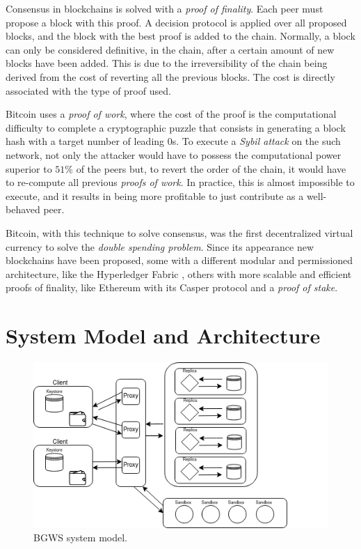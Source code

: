 \documentclass[10pt,journal,compsoc]{IEEEtran}
\begin{document}
	Consensus in blockchains is solved with a \textit{proof of finality}. Each peer must propose a block with this proof. A decision protocol is applied over all proposed blocks, and the block with the best proof is added to the chain. Normally, a block can only be considered definitive, in the chain, after a certain amount of new blocks have been added. This is due to the irreversibility of the chain being derived from the cost of reverting all the previous blocks. The cost is directly associated with the type of proof used.

	Bitcoin\cite{nakamoto2019bitcoin} uses a \textit{proof of work}, where the cost of the proof is the computational difficulty to complete a cryptographic puzzle that consists in generating a block hash with a target number of leading 0s. To execute a \textit{Sybil attack} on the such network, not only the attacker would have to possess the computational power superior to $51\%$ of the peers but, to revert the order of the chain, it would have to re-compute all previous \textit{proofs of work}. In practice, this is almost impossible to execute, and it results in being more profitable to just contribute as a well-behaved peer.

	Bitcoin, with this technique to solve consensus, was the first decentralized virtual currency to solve the \textit{double spending problem}. Since its appearance new blockchains have been proposed, some with a different modular and permissioned architecture, like the Hyperledger Fabric \cite{androulaki2018hyperledger}\cite{sousa2018byzantineHyperledger}, others with more scalable and efficient proofs of finality\cite{croman2016scaling}, like Ethereum with its Casper protocol\cite{CasperTheFriendlyFinalityGadget}\cite{CasperMadeSimple} and a \textit{proof of stake}.

	
	
	\section{System Model and Architecture}
	\begin{figure}[!ht]
		\includegraphics[width=\linewidth]{figures/System_Model.png}
		\caption{BGWS system model.}
	\end{figure}
	
\end{document}

